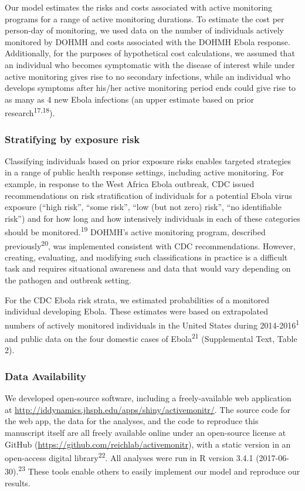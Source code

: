 \documentclass[]{article}
\begin{document}
Our model estimates the risks and costs associated with active
monitoring programs for a range of active monitoring durations. To
estimate the cost per person-day of monitoring, we used data on the
number of individuals actively monitored by DOHMH and costs associated
with the DOHMH Ebola response. Additionally, for the purposes of
hypothetical cost calculations, we assumed that an individual who
becomes symptomatic with the disease of interest while under active
monitoring gives rise to no secondary infections, while an individual
who develops symptoms after his/her active monitoring period ends could
give rise to as many as 4 new Ebola infections (an upper estimate based
on prior research\textsuperscript{17,18}).

\subsubsection{Stratifying by exposure
risk}\label{stratifying-by-exposure-risk}

Classifying individuals based on prior exposure risks enables targeted
strategies in a range of public health response settings, including
active monitoring. For example, in response to the West Africa Ebola
outbreak, CDC issued recommendations on risk stratification of
individuals for a potential Ebola virus exposure (``high risk'', ``some
risk'', ``low (but not zero) risk'', ``no identifiable risk'') and for
how long and how intensively individuals in each of these categories
should be monitored.\textsuperscript{19} DOHMH's active monitoring
program, described previously\textsuperscript{20}, was implemented
consistent with CDC recommendations. However, creating, evaluating, and
modifying such classifications in practice is a difficult task and
requires situational awareness and data that would vary depending on the
pathogen and outbreak setting.

For the CDC Ebola risk strata, we estimated probabilities of a monitored
individual developing Ebola. These estimates were based on extrapolated
numbers of actively monitored individuals in the United States during
2014-2016\textsuperscript{1} and public data on the four domestic cases
of Ebola\textsuperscript{21} (Supplemental Text, Table 2).

\subsubsection{Data Availability}\label{data-availability}

We developed open-source software, including a freely-available web
application at
\url{http://iddynamics.jhsph.edu/apps/shiny/activemonitr/}. The source
code for the web app, the data for the analyses, and the code to
reproduce this manuscript itself are all freely available online under
an open-source license at GitHub
(\url{https://github.com/reichlab/activemonitr}), with a static version
in an open-access digital library\textsuperscript{22}. All analyses were
run in R version 3.4.1 (2017-06-30).\textsuperscript{23} These tools
enable others to easily implement our model and reproduce our results.
\end{document}
